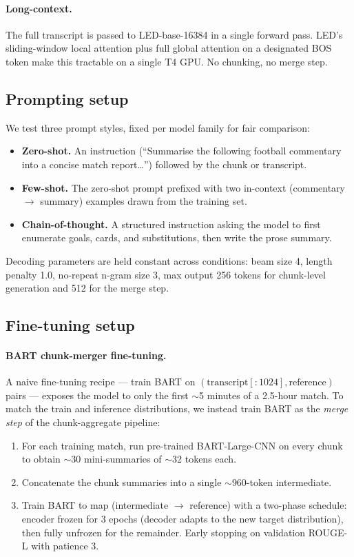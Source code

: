 \documentclass[10pt,a4paper]{article}
\begin{document}
\paragraph{Long-context.}
The full transcript is passed to LED-base-16384 \citep{beltagy2020longformer} in a single forward pass. LED's sliding-window local attention plus full global attention on a designated BOS token make this tractable on a single T4 GPU. No chunking, no merge step.

\subsection{Prompting setup}
We test three prompt styles, fixed per model family for fair comparison:

\begin{itemize}[leftmargin=*,itemsep=2pt,topsep=2pt]
\item \textbf{Zero-shot.} An instruction (``Summarise the following football commentary into a concise match report\dots'') followed by the chunk or transcript.
\item \textbf{Few-shot.} The zero-shot prompt prefixed with two in-context (commentary $\to$ summary) examples drawn from the training set.
\item \textbf{Chain-of-thought.} A structured instruction asking the model to first enumerate goals, cards, and substitutions, then write the prose summary.
\end{itemize}

Decoding parameters are held constant across conditions: beam size 4, length penalty 1.0, no-repeat n-gram size 3, max output 256 tokens for chunk-level generation and 512 for the merge step.

\subsection{Fine-tuning setup}

\paragraph{BART chunk-merger fine-tuning.}
A naive fine-tuning recipe --- train BART on $(\text{transcript}[:1024], \text{reference})$ pairs --- exposes the model to only the first $\sim$5 minutes of a 2.5-hour match. To match the train and inference distributions, we instead train BART as the \emph{merge step} of the chunk-aggregate pipeline:

\begin{enumerate}[leftmargin=*,itemsep=2pt,topsep=2pt]
\item For each training match, run pre-trained BART-Large-CNN on every chunk to obtain $\sim$30 mini-summaries of $\sim$32 tokens each.
\item Concatenate the chunk summaries into a single $\sim$960-token intermediate.
\item Train BART to map (intermediate $\to$ reference) with a two-phase schedule: encoder frozen for 3 epochs (decoder adapts to the new target distribution), then fully unfrozen for the remainder. Early stopping on validation ROUGE-L with patience 3.
\end{enumerate}
\end{document}
